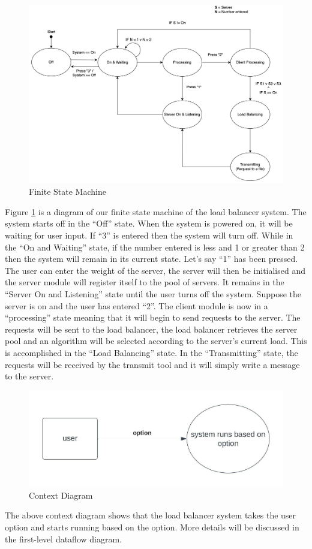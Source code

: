 \documentclass[12pt]{article}
\begin{document}
\begin{figure}[H]
\centering
\includegraphics[width=\linewidth]{images/load_balancer_finite_state_machine.jpg}
\caption{Finite State Machine}
\label{fig:Finite_State_Machine}
\end{figure}

Figure \ref{fig:Finite_State_Machine} is a diagram of our finite state machine of the load balancer system. The system starts off in the “Off” state. When the system is powered on, it will be waiting for user input. If “3” is entered then the system will turn off. While in the “On and Waiting” state, if the number entered is less and 1 or greater than 2 then the system will remain in its current state. Let’s say “1” has been pressed. The user can enter the weight of the server, the server will then be initialised and the server module will register itself to the pool of servers. It remains in the “Server On and Listening” state until the user turns off the system. Suppose the server is on and the user has entered “2”. The client module is now in a “processing” state meaning that it will begin to send requests to the server. The requests will be sent to the load balancer, the load balancer retrieves the server pool and an algorithm will be selected according to the server’s current load. This is accomplished in the “Load Balancing” state. In the “Transmitting” state, the requests will be received by the transmit tool and it will simply write a message to the server. 

\begin{figure}[H]
\centering
\includegraphics[width=\linewidth]{images/context_diagram.jpeg}
\caption{Context Diagram}
\label{fig:context_diagram}
\end{figure}
The above context diagram shows that the load balancer system takes the user option and starts running based on the option. More details will be discussed in the first-level dataflow diagram.
\end{document}
